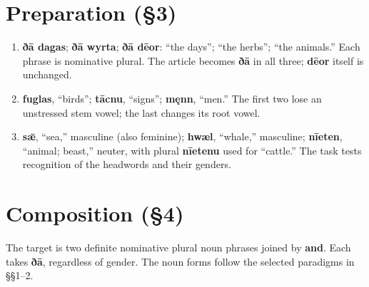 




\section*{Preparation (§3)}


\begin{enumerate}
\item[1.] \textbf{ðā dagas}; \textbf{ðā wyrta}; \textbf{ðā dēor}: “the days”; “the herbs”; “the animals.” Each phrase is nominative plural. The article becomes \textbf{ðā} in all three; \textbf{dēor} itself is unchanged.
\item[2.] \textbf{fuglas}, “birds”; \textbf{tācnu}, “signs”; \textbf{męnn}, “men.” The first two lose an unstressed stem vowel; the last changes its root vowel.
\item[3.] \textbf{sǣ}, “sea,” masculine (also feminine); \textbf{hwæl}, “whale,” masculine; \textbf{nīeten}, “animal; beast,” neuter, with plural \textbf{nīetenu} used for “cattle.” The task tests recognition of the headwords and their genders.
\end{enumerate}


\section*{Composition (§4)}


The target is two definite nominative plural noun phrases joined by \textbf{and}. Each takes \textbf{ðā}, regardless of gender. The noun forms follow the selected paradigms in §§1–2.


